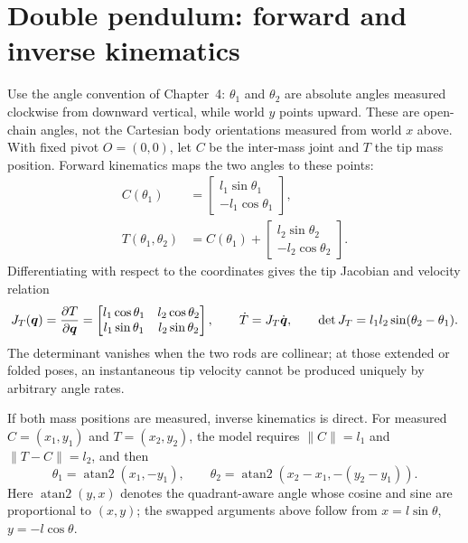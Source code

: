 \documentclass[../main.tex]{subfiles}
\begin{document}
\section{Double pendulum: forward and inverse kinematics}

Use the angle convention of Chapter~4: $\theta_1$ and $\theta_2$ are absolute angles measured clockwise from downward vertical, while world $y$ points upward. These are open-chain angles, not the Cartesian body orientations measured from world $x$ above. With fixed pivot $O=(0,0)$, let $C$ be the inter-mass joint and $T$ the tip mass position. Forward kinematics maps the two angles to these points:
\begin{equation}
\begin{aligned}
C(\theta_1)&=\begin{bmatrix}l_1\sin\theta_1\\-l_1\cos\theta_1\end{bmatrix},\\
T(\theta_1,\theta_2)&=C(\theta_1)
+\begin{bmatrix}l_2\sin\theta_2\\-l_2\cos\theta_2\end{bmatrix}.
\end{aligned}
\label{eq:double-pendulum-forward-kinematics}
\end{equation}
Differentiating with respect to the coordinates gives the tip Jacobian and velocity relation
\begin{equation}
J_T(\boldsymbol{q})=\frac{\partial T}{\partial\boldsymbol{q}}
=\begin{bmatrix}
l_1\cos\theta_1 & l_2\cos\theta_2\\
l_1\sin\theta_1 & l_2\sin\theta_2
\end{bmatrix},
\qquad \dot T=J_T\dot{\boldsymbol{q}},
\qquad \det J_T=l_1l_2\sin(\theta_2-\theta_1).
\label{eq:double-pendulum-forward-jacobian}
\end{equation}
The determinant vanishes when the two rods are collinear; at those extended or folded poses, an instantaneous tip velocity cannot be produced uniquely by arbitrary angle rates.

If both mass positions are measured, inverse kinematics is direct. For measured $C=(x_1,y_1)$ and $T=(x_2,y_2)$, the model requires $\|C\|=l_1$ and $\|T-C\|=l_2$, and then
\begin{equation}
\theta_1=\operatorname{atan2}(x_1,-y_1),
\qquad
\theta_2=\operatorname{atan2}(x_2-x_1,-(y_2-y_1)).
\label{eq:double-pendulum-inverse-from-both-masses}
\end{equation}
Here $\operatorname{atan2}(y,x)$ denotes the quadrant-aware angle whose cosine and sine are proportional to $(x,y)$; the swapped arguments above follow from $x=l\sin\theta$, $y=-l\cos\theta$.
\end{document}
